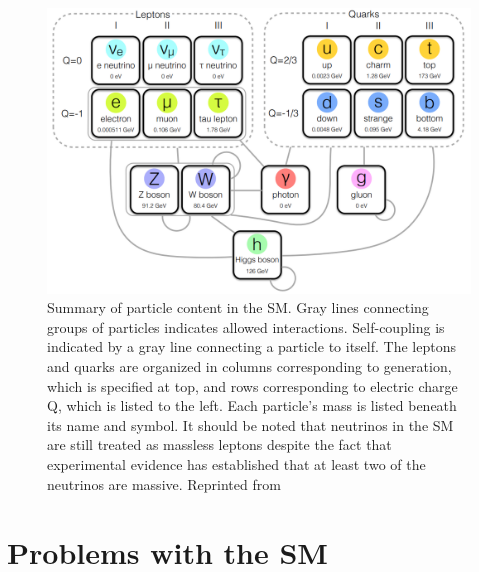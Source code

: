 \begin{figure}[h]
	\centering
	\includegraphics[width=1.0\linewidth]{Figures/SMcontent}
	\caption[Summary of content of the SM.]{Summary of particle content in the SM. Gray lines connecting groups of particles indicates allowed interactions. Self-coupling is indicated by a gray line connecting a particle to itself. The leptons and quarks are organized in columns corresponding to generation, which is specified at top, and rows corresponding to electric charge Q, which is listed to the left. Each particle's mass is listed beneath its name and symbol. It should be noted that neutrinos in the SM are still treated as massless leptons despite the fact that experimental evidence has established that at least two of the neutrinos are massive. Reprinted from \cite{Iiyama:2015nem}}
	\label{fig:smcontent}
\end{figure}


\section{Problems with the SM}
